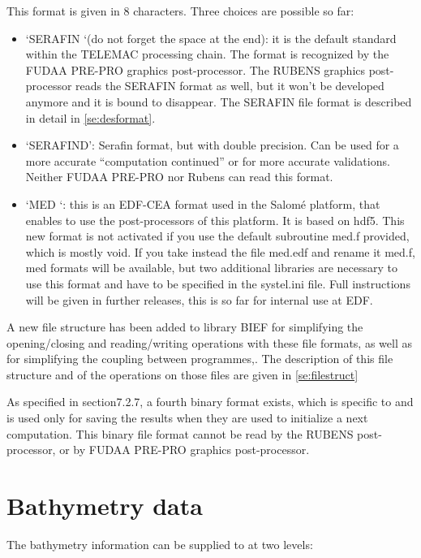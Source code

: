  This format is given in 8 characters. Three choices are possible so far:

\begin{itemize}
\item  `SERAFIN `(do not forget the space at the end): it is the default standard
  within the TELEMAC processing chain. The format is recognized by the FUDAA PRE-PRO
  graphics post-processor. The RUBENS graphics post-processor reads the SERAFIN format
  as well, but it won't be developed anymore and it is bound to disappear. The SERAFIN
  file format is described in detail in \ref{se:desformat}.

\item  `SERAFIND': Serafin format, but with double precision. Can be used for a more
  accurate ``computation continued'' or for more accurate validations. Neither FUDAA
  PRE-PRO nor Rubens can read this format.

\item  `MED  `: this is an EDF-CEA format used in the Salomé platform, that enables to
  use the post-processors of this platform. It is based on hdf5. This new format is not
  activated if you use the default subroutine med.f provided, which is mostly void. If
  you take instead the file med.edf and rename it med.f, med formats will be available,
  but two additional libraries are necessary to use this format and have to be specified
  in the systel.ini file. Full instructions will be given in further releases, this is
  so far for internal use at EDF.
\end{itemize}

A new file structure has been added to library BIEF for simplifying the opening/closing
and reading/writing operations with these file formats, as well as for simplifying the
coupling between programmes,. The description of this file structure and of the
operations on those files are given in \ref{se:filestruct}

As specified in section7.2.7, a fourth binary format exists, which is specific to
\tomawac and is used only for saving the results when they are used to initialize a
next computation. This binary file format cannot be read by the RUBENS post-processor,
or by FUDAA PRE-PRO graphics post-processor.


\section{ Bathymetry data }
\label{se:bathydata}
 The bathymetry information can be supplied to \tomawac at two levels:

